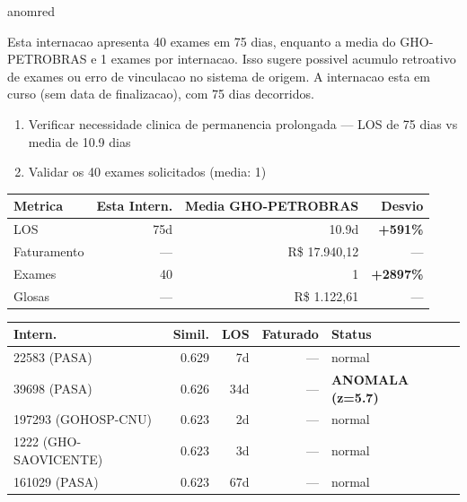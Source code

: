 \documentclass[a4paper,10pt]{article}
\begin{document}
\begin{anomalycard}[Internacao 161010 | GHO-PETROBRAS | CRITICO (z=5.68)]{anomred}
\vspace{2pt}\begin{tcolorbox}[colback=severityred!20,colframe=anomred,title={\textbf{Interpretacao de Negocio}},fonttitle=\bfseries\small,left=4pt,right=4pt,top=3pt,bottom=3pt]
{\small Esta internacao apresenta 40 exames em 75 dias, enquanto a media do GHO-PETROBRAS e 1 exames por internacao. Isso sugere possivel acumulo retroativo de exames ou erro de vinculacao no sistema de origem. A internacao esta em curso (sem data de finalizacao), com 75 dias decorridos.}
\end{tcolorbox}
\begin{tcolorbox}[colback=severityyellow!30,colframe=anomorange,title={\textbf{Recomendacoes Especificas}},fonttitle=\bfseries\small,left=4pt,right=4pt,top=3pt,bottom=3pt]
\begin{enumerate}[nosep,leftmargin=16pt]
\item {\small Verificar necessidade clinica de permanencia prolongada --- LOS de 75 dias vs media de 10.9 dias}
\item {\small Validar os 40 exames solicitados (media: 1)}
\end{enumerate}
\end{tcolorbox}
\begin{center}\begin{tabular}{l r r r}\toprule\textbf{Metrica} & \textbf{Esta Intern.} & \textbf{Media GHO-PETROBRAS} & \textbf{Desvio} \\\midrule
LOS & 75d & 10.9d & \textcolor{anomred}{\textbf{+591\%}} \\
Faturamento & --- & R\$ 17.940,12 & --- \\
Exames & 40 & 1 & \textcolor{anomred}{\textbf{+2897\%}} \\
Glosas & --- & R\$ 1.122,61 & --- \\
\bottomrule\end{tabular}\end{center}

\begin{tabular}{l r r r l}\toprule\textbf{Intern.} & \textbf{Simil.} & \textbf{LOS} & \textbf{Faturado} & \textbf{Status} \\\midrule
22583 (PASA) & 0.629 & 7d & --- & \textcolor{jcubeblue}{normal} \\
39698 (PASA) & 0.626 & 34d & --- & \textcolor{anomred}{\textbf{ANOMALA (z=5.7)}} \\
197293 (GOHOSP-CNU) & 0.623 & 2d & --- & \textcolor{jcubeblue}{normal} \\
1222 (GHO-SAOVICENTE) & 0.623 & 3d & --- & \textcolor{jcubeblue}{normal} \\
161029 (PASA) & 0.623 & 67d & --- & \textcolor{jcubeblue}{normal} \\
\bottomrule\end{tabular}


\end{anomalycard}
\end{document}
